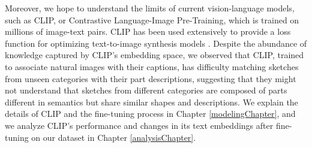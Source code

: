 Moreover, we hope to understand the limits of current vision-language models, such as CLIP, or Contrastive Language-Image Pre-Training, which is trained on millions of image-text pairs. CLIP has been used extensively to provide a loss function for optimizing text-to-image synthesis models \citep{clipDrawPaper,dalle2Paper,styleganNadaPaper,styleCLIPPaper}. Despite the abundance of knowledge captured by CLIP's embedding space, we observed that CLIP, trained to associate natural images with their captions, has difficulty matching sketches from unseen categories with their part descriptions, suggesting that they might not understand that sketches from different categories are composed of parts different in semantics but share similar shapes and descriptions. We explain the details of CLIP and the fine-tuning process in Chapter \ref{modelingChapter}, and we analyze CLIP's performance and changes in its text embeddings after fine-tuning on our dataset in Chapter \ref{analysisChapter}. 


